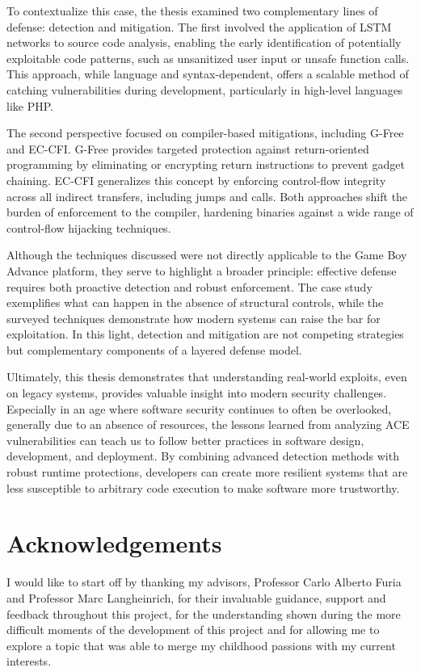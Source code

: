 \documentclass[a4paper]{usiinfbachelorproject}
\begin{document}
To contextualize this case, the thesis examined two complementary lines of defense: detection and mitigation. The first involved the application of LSTM networks to source code analysis, enabling the early identification of potentially exploitable code patterns, such as unsanitized user input or unsafe function calls. This approach, while language and syntax-dependent, offers a scalable method of catching vulnerabilities during development, particularly in high-level languages like PHP.

The second perspective focused on compiler-based mitigations, including G-Free and EC-CFI. G-Free provides targeted protection against return-oriented programming by eliminating or encrypting return instructions to prevent gadget chaining. EC-CFI generalizes this concept by enforcing control-flow integrity across all indirect transfers, including jumps and calls. Both approaches shift the burden of enforcement to the compiler, hardening binaries against a wide range of control-flow hijacking techniques.

Although the techniques discussed were not directly applicable to the Game Boy Advance platform, they serve to highlight a broader principle: effective defense requires both proactive detection and robust enforcement. The case study exemplifies what can happen in the absence of structural controls, while the surveyed techniques demonstrate how modern systems can raise the bar for exploitation. In this light, detection and mitigation are not competing strategies but complementary components of a layered defense model.

Ultimately, this thesis demonstrates that understanding real-world exploits, even on legacy systems, provides valuable insight into modern security challenges. Especially in an age where software security continues to often be overlooked, generally due to an absence of resources, the lessons learned from analyzing ACE vulnerabilities can teach us to follow better practices in software design, development, and deployment. By combining advanced detection methods with robust runtime protections, developers can create more resilient systems that are less susceptible to arbitrary code execution to make software more trustworthy.


\section{Acknowledgements}

I would like to start off by thanking my advisors, Professor Carlo Alberto Furia and Professor Marc Langheinrich, for their invaluable guidance, support and feedback throughout this project, for the understanding shown during the more difficult moments of the development of this project and for allowing me to explore a topic that was able to merge my childhood passions with my current interests.
\end{document}
